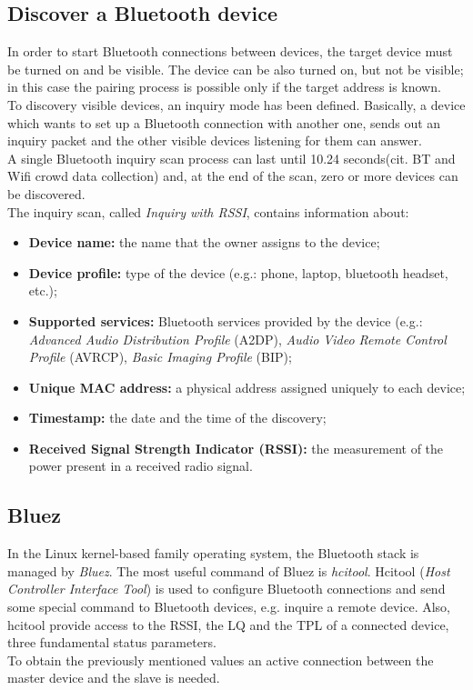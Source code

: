 \subsection{Discover a Bluetooth device}
In order to start Bluetooth connections between devices, the target device must be turned on and be visible. The device can be also turned on, but not be visible; in this case the pairing process is possible only if the target address is known.\\
To discovery visible devices, an inquiry mode has been defined. Basically, a device which wants to set up a Bluetooth connection with another one, sends out an inquiry packet and the other visible devices listening for them can answer.\\
A single Bluetooth inquiry scan process can last until 10.24 seconds(cit. BT and Wifi crowd data collection) and, at the end of the scan, zero or more devices can be discovered. \\
The inquiry scan, called \textit{Inquiry with RSSI}, contains information about:
\begin{itemize}
\item \textbf{Device name:} the name that the owner assigns to the device;
\item \textbf{Device profile:} type of the device (e.g.: phone, laptop, bluetooth headset, etc.);
\item \textbf{Supported services:} Bluetooth services provided by the device (e.g.: \textit{Advanced Audio Distribution Profile} (A2DP), \textit{Audio Video Remote Control Profile} (AVRCP), \textit{Basic Imaging Profile} (BIP);
\item \textbf{Unique MAC address:} a physical address assigned uniquely to each device;
\item \textbf{Timestamp:} the date and the time of the discovery;
\item \textbf{Received Signal Strength Indicator (RSSI):} the measurement of the power present in a received radio signal.
\end{itemize}

\subsection{Bluez}
In the Linux kernel-based family operating system, the Bluetooth stack is managed by \textit{Bluez}.
The most useful command of Bluez is \textit{hcitool}. Hcitool (\textit{Host Controller Interface Tool}) is used to configure Bluetooth connections and send some special command to Bluetooth devices, e.g. inquire a remote device.
Also, hcitool provide access to the RSSI, the LQ and the TPL of a connected device, three fundamental status parameters.\\
To obtain the previously mentioned values an active connection between the master device and the slave is needed.

